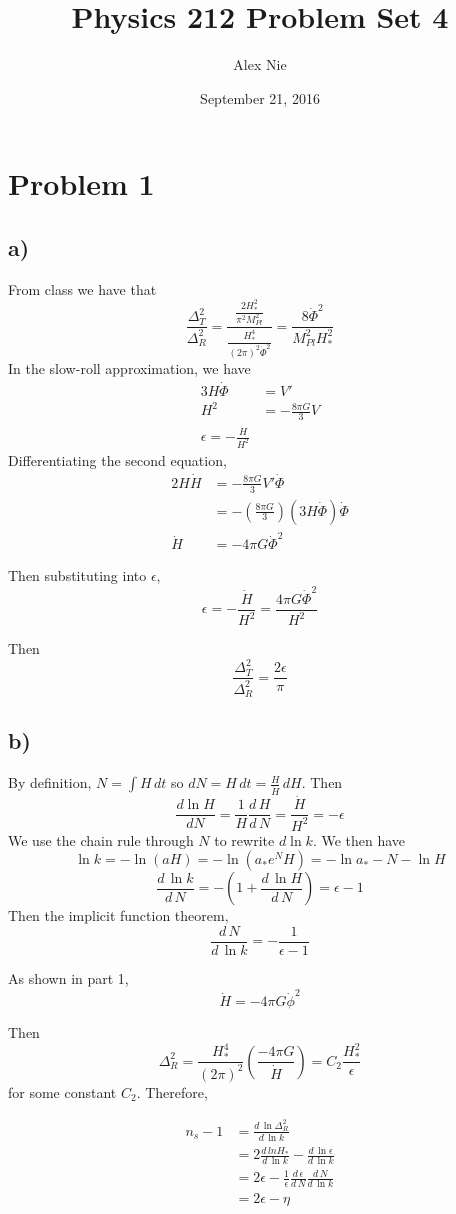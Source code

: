 \documentclass{article}
\title{Physics 212 Problem Set 4}
\author{Alex Nie}
\date{September 21, 2016}
\newcommand{\tot}[2]{\frac{d\,#1}{d\,#2}}
\begin{document}
\maketitle

\section*{Problem 1}
\subsection*{a)}
From class we have that
\[\frac{\Delta_T^2}{\Delta_R^2} =\frac{\frac{2H_*^2}{\pi^2 M_{Pl}^2}}{\frac{H_*^4}{(2\pi)^2\dot{\Phi}^2}} = \frac{8\dot{\Phi}^2}{M_{Pl}^2H_*^2}\]
In the slow-roll approximation, we have
\begin{align*}
3H\dot{\Phi} &= V'\\
H^2 &= -\frac{8\pi G}{3}V\\
\epsilon = -\frac{\dot{H}}{H^2}
\end{align*}
Differentiating the second equation,
\begin{align*}
2H\dot{H} &= -\frac{8\pi G}{3}V'\dot{\Phi}\\
&= -\left(\frac{8\pi G}{3}\right)(3H\dot{\Phi})\dot{\Phi}\\
\dot{H} &= -4\pi G \dot{\Phi}^2
\end{align*}

Then substituting into $\epsilon$, 
\[\epsilon = -\frac{\dot{H}}{H^2} = \frac{4\pi G\dot{\Phi}^2}{H^2}\]

Then
\[\frac{\Delta_T^2}{\Delta_R^2} = \frac{2\epsilon}{\pi}\]
\subsection*{b)}
By definition, $N=\int H\,dt$ so $dN = H\,dt=\frac{H}{\dot{H}}\,dH$. Then
\[\frac{d\ln H}{dN} = \frac{1}{H}\tot{H}{N} = \frac{\dot{H}}{H^2} = -\epsilon\]
We use the chain rule through $N$ to rewrite $d\ln k$. We then have
\[\ln k = -\ln (aH) = -\ln(a_* e^N H) = -\ln a_* - N - \ln H\]
\[\tot{\ln k}{N} = -(1+\tot{\ln H}{N}) = \epsilon-1\]
Then the implicit function theorem,
\[\tot{N}{\ln k} = -\frac{1}{\epsilon-1}\]

As shown in part 1, 
\[\dot{H} = -4\pi G\dot{\phi}^2\]

Then
\[\Delta_R^2 = \frac{H_*^4}{(2\pi)^2}\left(\frac{-4\pi G}{\dot{H}}\right) = C_2 \frac{H_*^2}{\epsilon}\]
for some constant $C_2$. Therefore,

\begin{align*}
n_s-1 &= \tot{\ln \Delta_R^2}{\ln k}\\
&= 2\tot{ln H_*}{\ln k}-\tot{\ln \epsilon}{\ln k}\\
&= 2\epsilon-\frac{1}{\epsilon}\tot{\epsilon}{N}\tot{N}{\ln k}\\
&=2\epsilon-\eta
\end{align*}
\end{document}
